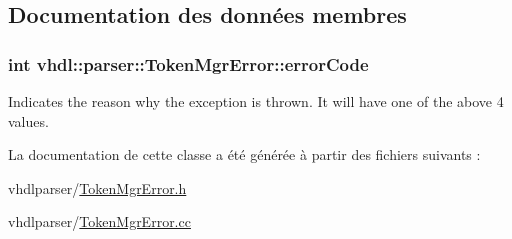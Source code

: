 \subsection{Documentation des données membres}
\hypertarget{classvhdl_1_1parser_1_1_token_mgr_error_ac142542be128305d21d59277db52eb93}{}
\subsubsection[{error\+Code}]{\setlength{\rightskip}{0pt plus 5cm}int vhdl\+::parser\+::\+Token\+Mgr\+Error\+::error\+Code}\label{classvhdl_1_1parser_1_1_token_mgr_error_ac142542be128305d21d59277db52eb93}
Indicates the reason why the exception is thrown. It will have one of the above 4 values. 

La documentation de cette classe a été générée à partir des fichiers suivants \+:\begin{DoxyCompactItemize}
\item 
vhdlparser/\hyperlink{_token_mgr_error_8h}{Token\+Mgr\+Error.\+h}\item 
vhdlparser/\hyperlink{_token_mgr_error_8cc}{Token\+Mgr\+Error.\+cc}\end{DoxyCompactItemize}
